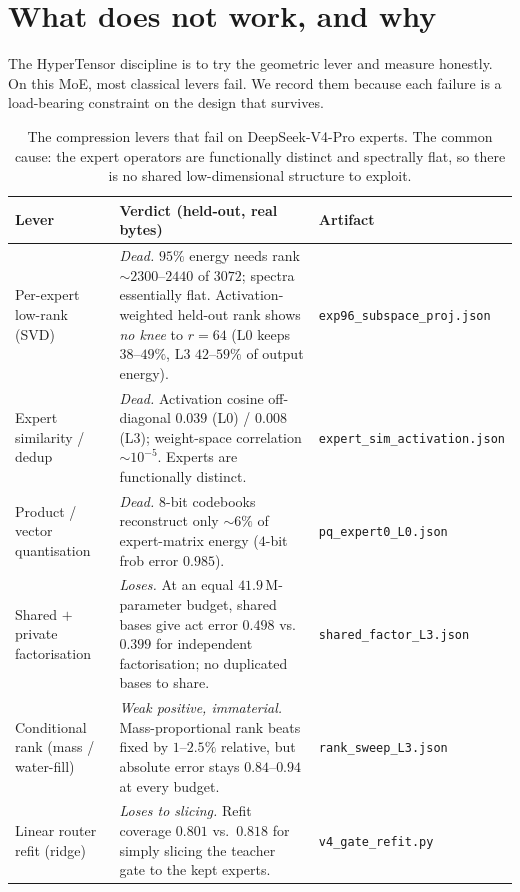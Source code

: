 \documentclass[11pt]{article}
\newcommand{\code}[1]{\texttt{#1}}
\begin{document}
\section{What does not work, and why}
\label{sec:negatives}

The HyperTensor discipline is to try the geometric lever and measure honestly.
On this MoE, most classical levers fail. We record them because each failure is
a load-bearing constraint on the design that survives.

\begin{table}[t]
\centering
\small
\setlength{\tabcolsep}{4pt}
\begin{tabular}{>{\raggedright\arraybackslash}p{4.6cm}>{\raggedright\arraybackslash}p{6.1cm}>{\raggedright\arraybackslash}p{2.9cm}}
\toprule
\textbf{Lever} & \textbf{Verdict (held-out, real bytes)} & \textbf{Artifact} \\
\midrule
Per-expert low-rank (SVD) &
\emph{Dead.} $95\%$ energy needs rank ${\sim}2300$--$2440$ of $3072$; spectra
essentially flat. Activation-weighted held-out rank shows \emph{no knee} to
$r{=}64$ (L0 keeps $38$--$49\%$, L3 $42$--$59\%$ of output energy). &
\code{exp96\_subspace\_proj.json} \\
\addlinespace
Expert similarity / dedup &
\emph{Dead.} Activation cosine off-diagonal $0.039$ (L0) / $0.008$ (L3);
weight-space correlation ${\sim}10^{-5}$. Experts are functionally distinct. &
\code{expert\_sim\_activation.json} \\
\addlinespace
Product / vector quantisation &
\emph{Dead.} $8$-bit codebooks reconstruct only ${\sim}6\%$ of expert-matrix
energy ($4$-bit frob error $0.985$). &
\code{pq\_expert0\_L0.json} \\
\addlinespace
Shared $+$ private factorisation &
\emph{Loses.} At an equal $41.9\,\textrm{M}$-parameter budget, shared bases give
act error $0.498$ vs.\ $0.399$ for independent factorisation; no duplicated
bases to share. &
\code{shared\_factor\_L3.json} \\
\addlinespace
Conditional rank (mass / water-fill) &
\emph{Weak positive, immaterial.} Mass-proportional rank beats fixed by
$1$--$2.5\%$ relative, but absolute error stays $0.84$--$0.94$ at every budget. &
\code{rank\_sweep\_L3.json} \\
\addlinespace
Linear router refit (ridge) &
\emph{Loses to slicing.} Refit coverage $0.801$ vs.\ $0.818$ for simply slicing
the teacher gate to the kept experts. &
\code{v4\_gate\_refit.py} \\
\bottomrule
\end{tabular}
\caption{The compression levers that fail on DeepSeek-V4-Pro experts. The common
cause: the expert operators are functionally distinct and spectrally flat, so
there is no shared low-dimensional structure to exploit.}
\label{tab:negatives}
\end{table}
\end{document}
